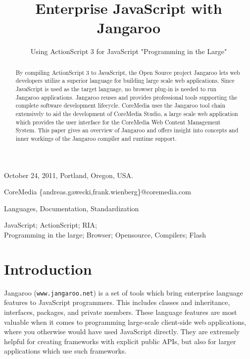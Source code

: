 \documentclass[10pt]{sigplanconf}
\begin{document}
 
 {October 24, 2011, Portland, Oregon, USA.}

\title{Enterprise JavaScript with Jangaroo}
\subtitle{Using ActionScript 3 for JavaScript "Programming in the Large"}

           {CoreMedia}
           {\{andreas.gawecki,frank.wienberg\}@coremedia.com}

\maketitle

\begin{abstract}
By compiling ActionScript 3 to JavaScript, the Open Source project Jangaroo lets web developers utilize a superior language for building large scale web applications. Since JavaScript is used as the target language, no browser plug-in is needed to run Jangaroo applications. Jangaroo reuses and provides professional tools supporting the complete software development lifecycle. CoreMedia uses the Jangaroo tool chain extensively to aid the development of CoreMedia Studio, a large scale web application which provides the user interface for the CoreMedia Web Content Management System. This paper gives an overview of Jangaroo and offers insight into concepts and inner workings of the Jangaroo compiler and runtime support.
\end{abstract}


\terms
Languages, Documentation, Standardization 

\keywords
JavaScript; ActionScript;
RIA; \\
Programming in the large; 
Browser; Opensource, Compilers; 
Flash

\section{Introduction}

Jangaroo (\texttt{www.jangaroo.net}) is a set of tools which bring enterprise language features to JavaScript programmers. This includes classes and inheritance, interfaces, packages, and private members. These language features are most valuable when it comes to programming large-scale client-side web applications, where you otherwise would have used JavaScript directly. They are extremely helpful for creating frameworks with explicit public APIs, but also for larger applications which use such frameworks.
\end{document}
